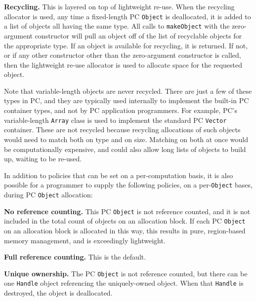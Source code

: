 \vspace{5pt}
\noindent
\textbf{Recycling.}  This is layered on top of lightweight re-use.  When the recycling allocator is used, any time a fixed-length
PC \texttt{Object} is deallocated, it is
added to a list of objects all having the same type.  All calls to \texttt{makeObject} with the zero-argument constructor will
pull an object off of the list of recyclable objects for the appropriate type.  
If an object is available for recycling, it is returned.  If not, or if any other constructor other than the zero-argument constructor is called, 
then the lightweight re-use allocator is used to allocate space for the requested
object.

\vspace{5pt}
\noindent
Note that
variable-length objects are never recycled.  There are just a few of these types in PC, and they are typically
used internally to implement the built-in PC container
types, and not by PC application programmers.  For example, PC's variable-length
\texttt{Array} class is used to implement the standard PC \texttt{Vector} container.  
These are not recycled because recycling allocations of such objects would need to match both on type and on size.  Matching on both at once would 
be computationally expensive, and could also allow long lists of objects to build up, waiting to be re-used.

In addition to policies that can be set on a per-computation basis,
it is also possible for a programmer to supply the following policies, on a per-\texttt{Object} bases, during PC \texttt{Object} allocation:

\vspace{5pt}
\noindent
\textbf{No reference counting.}  This PC \texttt{Object} is not reference counted, and it is not included in the total count of objects on an allocation
block.  If each PC \texttt{Object} on an allocation block
is allocated in this way, this results in pure, region-based memory management, and is exceedingly lightweight.

\vspace{5pt}
\noindent
\textbf{Full reference counting.}  This is the default.

\vspace{5pt}
\noindent
\textbf{Unique ownership.}  The PC \texttt{Object} is not reference counted, but there can be one \texttt{Handle} object referencing the uniquely-owned
object.  When that \texttt{Handle} is destroyed, the object is deallocated.


